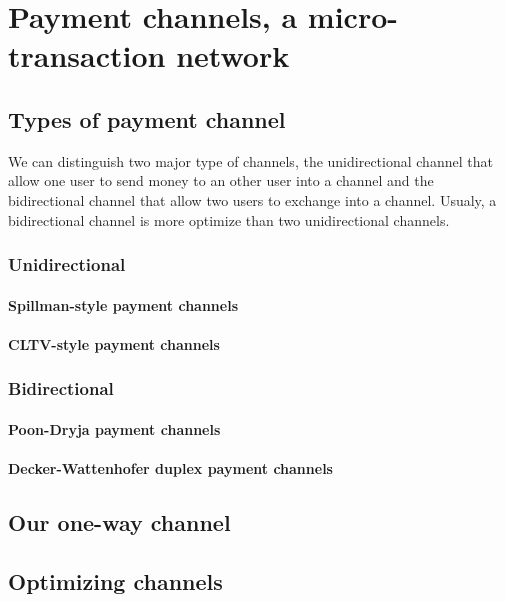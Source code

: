 \chapter{Payment channels, a micro-transaction network}
\label{chap:paymentChannels}


\minitoc

\newpage

\section{Types of payment channel}

We can distinguish two major type of channels, the unidirectional channel that allow
one user to send money to an other user into a channel and the bidirectional channel
that allow two users to exchange into a channel. Usualy, a bidirectional channel is
more optimize than two unidirectional channels.

\subsection{Unidirectional}

\subsubsection{Spillman-style payment channels}

\subsubsection{CLTV-style payment channels}

\subsection{Bidirectional}

\subsubsection{Poon-Dryja payment channels}

\subsubsection{Decker-Wattenhofer duplex payment channels}

\section{Our one-way channel}


\section{Optimizing channels}

